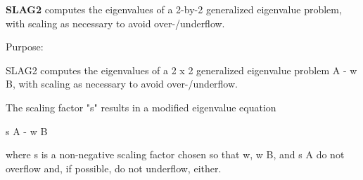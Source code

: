 {\bfseries S\+L\+A\+G2} computes the eigenvalues of a 2-\/by-\/2 generalized eigenvalue problem, with scaling as necessary to avoid over-\//underflow. 

 \begin{DoxyParagraph}{Purpose\+: }
\begin{DoxyVerb} SLAG2 computes the eigenvalues of a 2 x 2 generalized eigenvalue
 problem  A - w B, with scaling as necessary to avoid over-/underflow.

 The scaling factor "s" results in a modified eigenvalue equation

     s A - w B

 where  s  is a non-negative scaling factor chosen so that  w,  w B,
 and  s A  do not overflow and, if possible, do not underflow, either.\end{DoxyVerb}
 
\end{DoxyParagraph}

